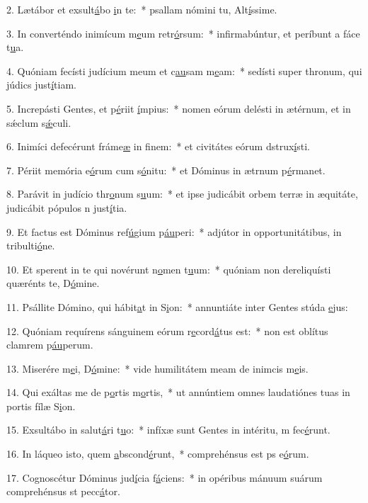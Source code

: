 2. Lætábor et exsult\uline{á}bo \uline{i}n te:~* psallam nómini tu, Alt\uline{í}ssime.\par 
3. In converténdo inimícum m\uline{e}um retr\uline{ó}rsum:~* infirmabúntur, et períbunt a fáce t\uline{u}a.\par 
4. Quóniam fecísti judícium meum et c\uline{au}sam m\uline{e}am:~* sedísti super thronum, qui júdics just\uline{í}tiam.\par 
5. Increpásti Gentes, et p\uline{é}riit \uline{í}mpius:~* nomen eórum delésti in ætérnum, et in sǽclum s\uline{ǽ}culi.\par 
6. Inimíci defecérunt fráme\uline{æ} in f\uline{i}nem:~* et civitátes eórum dstrux\uline{í}sti.\par 
7. Périit memória e\uline{ó}rum cum s\uline{ó}nitu:~* et Dóminus in ætrnum p\uline{é}rmanet.\par 
8. Parávit in judício thr\uline{o}num s\uline{u}um:~* et ipse judicábit orbem terræ in æquitáte, judicábit pópulos n just\uline{í}tia.\par 
9. Et factus est Dóminus ref\uline{ú}gium p\uline{áu}peri:~* adjútor in opportunitátibus, in tribulti\uline{ó}ne.\par 
10. Et sperent in te qui novérunt n\uline{o}men t\uline{u}um:~* quóniam non dereliquísti quærénts te, D\uline{ó}mine.\par 
11. Psállite Dómino, qui hábit\uline{a}t in S\uline{i}on:~* annuntiáte inter Gentes stúda \uline{e}jus:\par 
12. Quóniam requírens sánguinem eórum r\uline{e}cord\uline{á}tus est:~* non est oblítus clamrem p\uline{áu}perum.\par 
13. Miserére m\uline{e}i, D\uline{ó}mine:~* vide humilitátem meam de inimcis m\uline{e}is.\par 
14. Qui exáltas me de p\uline{o}rtis m\uline{o}rtis,~* ut annúntiem omnes laudatiónes tuas in portis fílæ S\uline{i}on.\par 
15. Exsultábo in salut\uline{á}ri t\uline{u}o:~* infíxæ sunt Gentes in intéritu, m fec\uline{é}runt.\par 
16. In láqueo isto, quem \uline{a}bscond\uline{é}runt,~* comprehénsus est ps e\uline{ó}rum.\par 
17. Cognoscétur Dóminus jud\uline{í}cia f\uline{á}ciens:~* in opéribus mánuum suárum comprehénsus st pecc\uline{á}tor.\par 

